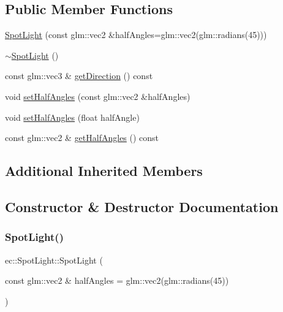 \subsection*{Public Member Functions}
\begin{DoxyCompactItemize}
\item 
\mbox{\hyperlink{classec_1_1_spot_light_a52800f7bbfacd2e5a4ef2f3f6696cb46}{Spot\+Light}} (const glm\+::vec2 \&half\+Angles=glm\+::vec2(glm\+::radians(45)))
\item 
\mbox{\hyperlink{classec_1_1_spot_light_adc9a1ffa198252e085c6862c063c8263}{$\sim$\+Spot\+Light}} ()
\item 
const glm\+::vec3 \& \mbox{\hyperlink{classec_1_1_spot_light_a373e8b5dc16c19fb7a0ba8ea5333f551}{get\+Direction}} () const
\item 
void \mbox{\hyperlink{classec_1_1_spot_light_a70ee7996e77f4961cca8864cea037906}{set\+Half\+Angles}} (const glm\+::vec2 \&half\+Angles)
\item 
void \mbox{\hyperlink{classec_1_1_spot_light_a0b9a13abe376b5e0513f243036b41af9}{set\+Half\+Angles}} (float half\+Angle)
\item 
const glm\+::vec2 \& \mbox{\hyperlink{classec_1_1_spot_light_a1f53e54ee38973a55438c0321b78b439}{get\+Half\+Angles}} () const
\end{DoxyCompactItemize}
\subsection*{Additional Inherited Members}


\subsection{Constructor \& Destructor Documentation}
\mbox{\label{classec_1_1_spot_light_a52800f7bbfacd2e5a4ef2f3f6696cb46}} 
\subsubsection{\texorpdfstring{Spot\+Light()}{SpotLight()}}
{\footnotesize\ttfamily ec\+::\+Spot\+Light\+::\+Spot\+Light (\begin{DoxyParamCaption}\item[{const glm\+::vec2 \&}]{half\+Angles = {\ttfamily glm\+:\+:vec2(glm\+:\+:radians(45))} }\end{DoxyParamCaption})\hspace{0.3cm}{\ttfamily [explicit]}}

